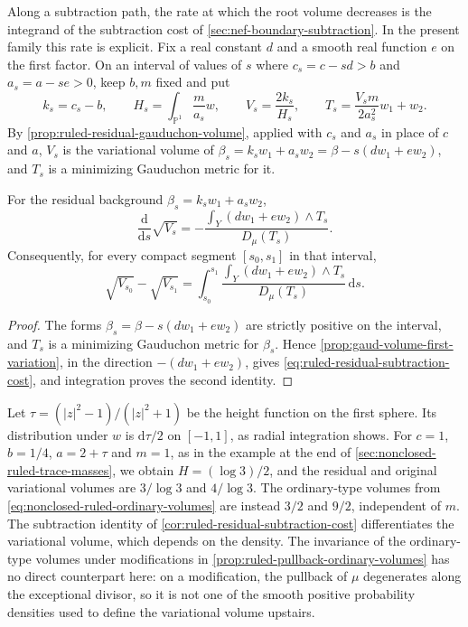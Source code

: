 Along a subtraction path, the rate at which the root volume decreases is the integrand of the subtraction cost of \cref{sec:nef-boundary-subtraction}. In the present family this rate is explicit. Fix a real constant $d$ and a smooth real function $e$ on the first factor. On an interval of values of $s$ where $c_s=c-sd>b$ and $a_s=a-se>0$, keep $b,m$ fixed and put
\[
 k_s=c_s-b,\qquad H_s=\int_{\mathbb P^1}\frac{m}{a_s}w,
 \qquad V_s=\frac{2k_s}{H_s},\qquad
 T_s=\frac{V_sm}{2a_s^2}w_1+w_2.
\]
By \cref{prop:ruled-residual-gauduchon-volume}, applied with $c_s$ and $a_s$ in place of $c$ and $a$, $V_s$ is the variational volume of $\beta_s=k_sw_1+a_sw_2=\beta-s(dw_1+ew_2)$, and $T_s$ is a minimizing Gauduchon metric for it.
\begin{corollary}\label{cor:ruled-residual-subtraction-cost}
For the residual background $\beta_s=k_sw_1+a_sw_2$,
\begin{equation}\label{eq:ruled-residual-subtraction-cost}
 \frac{\mathrm d}{\mathrm ds}\sqrt{V_s}
     =-\frac{\int_Y(d w_1+e w_2)\wedge T_s}{D_\mu(T_s)}.
\end{equation}
Consequently, for every compact segment $[s_0,s_1]$ in that interval,
\[
 \sqrt{V_{s_0}}-\sqrt{V_{s_1}}
   =\int_{s_0}^{s_1}
       \frac{\int_Y(d w_1+e w_2)\wedge T_s}{D_\mu(T_s)}\,\mathrm ds.
\]
\end{corollary}
\begin{proof}
The forms $\beta_s=\beta-s(dw_1+ew_2)$ are strictly positive on the interval, and $T_s$ is a minimizing Gauduchon metric for $\beta_s$. Hence \cref{prop:gaud-volume-first-variation}, in the direction $-(dw_1+ew_2)$, gives \eqref{eq:ruled-residual-subtraction-cost}, and integration proves the second identity.
\end{proof}

Let $\tau=(|z|^2-1)/(|z|^2+1)$ be the height function on the first sphere. Its distribution under $w$ is $\mathrm d\tau/2$ on $[-1,1]$, as radial integration shows. For $c=1$, $b=1/4$, $a=2+\tau$ and $m=1$, as in the example at the end of \cref{sec:nonclosed-ruled-trace-masses}, we obtain $H=(\log3)/2$, and the residual and original variational volumes are $3/\log3$ and $4/\log3$. The ordinary-type volumes from \eqref{eq:nonclosed-ruled-ordinary-volumes} are instead $3/2$ and $9/2$, independent of $m$. The subtraction identity of \cref{cor:ruled-residual-subtraction-cost} differentiates the variational volume, which depends on the density. The invariance of the ordinary-type volumes under modifications in \cref{prop:ruled-pullback-ordinary-volumes} has no direct counterpart here: on a modification, the pullback of $\mu$ degenerates along the exceptional divisor, so it is not one of the smooth positive probability densities used to define the variational volume upstairs.


